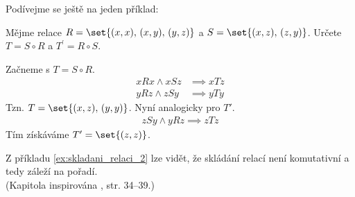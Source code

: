Podívejme se ještě na jeden příklad:
\begin{example}\label{ex:skladani_relaci_2}
    Mějme relace $R=\set{(x,x),\,(x,y),\,(y,z)}$ a $S=\set{(x,z),\,(z,y)}$. Určete $T=S\circ R$ a $T^\prime=R\circ S$.
\end{example}
\begin{solution}
    Začneme s $T=S\circ R$.
    \begin{align*}
        xRx \land xSz &\implies xTz\\
        yRz \land zSy &\implies yTy
    \end{align*}
    Tzn. $T=\set{(x,z),\,(y,y)}$. Nyní analogicky pro $T\prime$.
    \begin{align*}
        zSy \land yRz \implies zTz
    \end{align*}
    Tím získáváme $T^\prime=\set{(z,z)}$.
\end{solution}
Z příkladu \ref{ex:skladani_relaci_2} lze vidět, že skládání relací není komutativní a tedy záleží na pořadí.\\
(Kapitola inspirována \cite{MatousekNesetril2009}, str. 34--39.)

